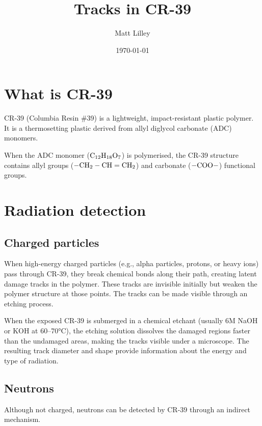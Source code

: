 \documentclass[
]{article}
\title{Tracks in CR-39}
\author{Matt Lilley}
\date{\today}  %
\renewcommand{\[}{\begin{equation}}
\renewcommand{\]}{\end{equation}}
\begin{document}
\maketitle

\section{What is CR-39}\label{what-is-cr-39}

CR-39 (Columbia Resin \#39) is a lightweight, impact-resistant plastic
polymer. It is a thermosetting plastic derived from allyl diglycol
carbonate (ADC) monomers.

When the ADC monomer (\(\rm C_{12} H_{18} O_7\)) is polymerised, the
CR-39 structure contains allyl groups (\(\rm-CH_2-CH=CH_2\)) and
carbonate (\(\rm -COO-\)) functional groups.

\section{Radiation detection}\label{radiation-detection}

\subsection{Charged particles}\label{charged-particles}

When high-energy charged particles (e.g., alpha particles, protons, or
heavy ions) pass through CR-39, they break chemical bonds along their
path, creating latent damage tracks in the polymer. These tracks are
invisible initially but weaken the polymer structure at those points.
The tracks can be made visible through an etching process.

When the exposed CR-39 is submerged in a chemical etchant (usually 6M
NaOH or KOH at 60--70°C), the etching solution dissolves the damaged
regions faster than the undamaged areas, making the tracks visible under
a microscope. The resulting track diameter and shape provide information
about the energy and type of radiation.

\subsection{Neutrons}\label{neutrons}

Although not charged, neutrons can be detected by CR-39 through an
indirect mechanism.

\printbibliography
\end{document}
